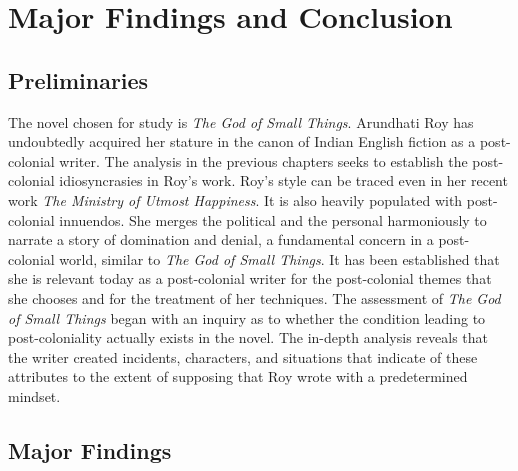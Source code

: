 \chapter{Major Findings and Conclusion}

\section{Preliminaries}

The novel chosen for study is \emph{The God of Small Things}. Arundhati Roy has undoubtedly acquired her stature in the canon of Indian English fiction as a post-colonial writer.  The analysis in the previous chapters seeks to establish the post-colonial idiosyncrasies in Roy’s work. Roy’s style can be traced even in her recent work \emph{The Ministry of Utmost Happiness}. It is also heavily populated with post-colonial innuendos. She merges the political and the personal harmoniously to narrate a story of domination and denial, a fundamental concern in a post-colonial world, similar to \emph{The God of Small Things}. It has been established that she is relevant today as a post-colonial writer for the post-colonial themes that she chooses and for the treatment of her techniques. The assessment of \emph{The God of Small Things} began with an inquiry as to whether the condition leading to post-coloniality actually exists in the novel. The in-depth analysis reveals that the writer created incidents, characters, and situations that indicate of these attributes to the extent of supposing that Roy wrote with a predetermined mindset.

\section{Major Findings}

